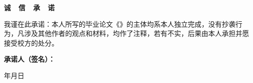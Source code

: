 \newpage

\makebox[1em][s]{\ \hfill}

\vspace{1.0em}

\begin{center}
     \kaiti \bfseries
    诚\ \ 信\ \ 承\ \ 诺
\end{center}
    

\vspace{2.3em}

\begin{spacing}{2.0}

    我谨在此承诺：本人所写的毕业论文《\thesistitle》的主体均系本人独立完成，没有抄袭行为，凡涉及其他作者的观点和材料，均作了注释，若有不实，后果由本人承担并愿接受校方的处分。
\end{spacing}

\vspace{2.4em}


\begin{flushright}
     \kaiti \bfseries
    承诺人（签名）：\makebox[8.5em][s]{\hspace{\fill}} 

    \vspace{0.2em}
    \makebox[3em][s]{\hspace{\fill}}年\makebox[2em][s]{\hspace{\fill}}月\makebox[2em][s]{\hspace{\fill}}日 \makebox[6.5em][s]{\hspace{\fill}}
\end{flushright}
  
                

